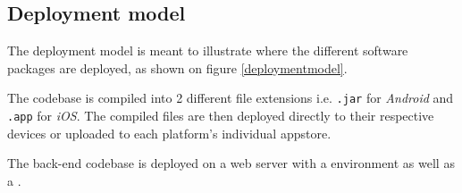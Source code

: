 \subsection{Deployment model}
The deployment model is meant to illustrate where the different software packages are deployed, as shown on figure \ref{deploymentmodel}.

The  codebase is compiled into 2 different file extensions i.e. \verb+.jar+ for \textit{Android} and \verb+.app+ for \textit{iOS}. The compiled files are then deployed directly to their respective devices or uploaded to each platform's individual \gls{appstore}.

The back-end codebase is deployed on a web server with a  environment as well as a .

